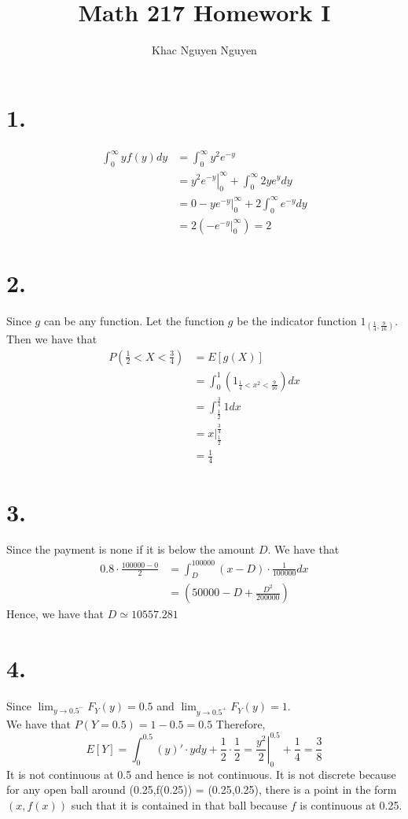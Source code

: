 \documentclass[11pt]{article}
\title{\textbf{Math 217 Homework I}}
\author{Khac Nguyen Nguyen}
\date{}
\begin{document}
\section*{1.}
\begin{equation*}
    \begin{aligned}
        \int_0^\infty yf(y) dy 
        &= \int_0^\infty y^2e^{-y} \\
        &= \left.y^2e^{-y} \right|^\infty_0 + \int_0^\infty 2ye^y dy \\
        &= 0 - \left.ye^{-y}\right|^\infty_0 + 2\int_0^\infty e^{-y}dy \\
        &= 2\left(-e^{-y}|_0^\infty\right) = 2
    \end{aligned}
\end{equation*}
\pagebreak
\section*{2.}
Since $g$ can be any function. Let the function $g$ be the indicator function $1_{\left(\frac{1}{4}, \frac{9}{16}\right)}$.
Then we have that 
\begin{equation*}
    \begin{aligned}
        P\left(\frac{1}{2} < X < \frac{3}{4}\right) &= E[g(X)] \\
        &= \int_{0}^{1}\left(1_{\frac{1}{4}<x^{2}<\frac{9}{16}}\right)dx \\ 
        &=\int_{\frac{1}{2}}^{\frac{3}{4}}1 dx \\
        &= x|_\frac{1}{2}^\frac{3}{4} \\
        &= \frac{1}{4}
    \end{aligned}
\end{equation*}
\pagebreak
\section*{3.}
Since the payment is none if it is below the amount $D$. We have that 
\begin{equation*}
    \begin{aligned}
        0.8 \cdot \frac{100000-0}{2} 
        &= \int_D^{100000} (x-D) \cdot \frac{1}{100000} dx \\
        &= \left(50000 - D + \frac{D^2}{200000}\right)
    \end{aligned}
\end{equation*}
Hence,  we have that $D \simeq 10557.281$
\pagebreak
\section*{4.}
Since $\lim_{y\to 0.5^-} F_Y(y) = 0.5$ and $\lim_{y\to 0.5^+} F_Y(y) = 1$. \\ 
We have that $P(Y=0.5) = 1-0.5 = 0.5$
Therefore, 
\[
    E[Y] = \int_0^{0.5} (y)' \cdot y dy + \frac{1}{2} \cdot \frac{1}{2} 
    = \left.\frac{y^2}{2} \right|_0^{0.5} + \frac{1}{4} 
    = \frac{3}{8}
\]
It is not continuous at 0.5 and hence is not continuous.
It is not discrete because for any open ball around (0.25,f(0.25)) = (0.25,0.25), there is a point in the form 
$(x,f(x))$ such that it is contained in that ball because $f$ is continuous at 0.25.
\end{document}
